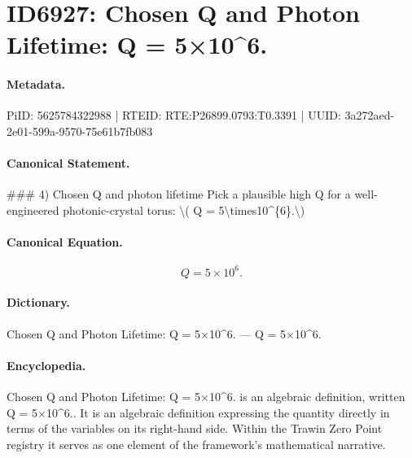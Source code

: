 \section*{ID6927: Chosen Q and Photon Lifetime: Q = 5×10\textasciicircum{}6.}
\paragraph{Metadata.}
PiID: 5625784322988 | RTEID: RTE:P26899.0793:T0.3391 | UUID: 3a272aed-2e01-599a-9570-75e61b7fb083

\paragraph{Canonical Statement.}
\#\#\# 4) Chosen Q and photon lifetime Pick a plausible high Q for a well-engineered photonic-crystal torus: \textbackslash{}( Q = 5\textbackslash{}times10\textasciicircum{}\{6\}.\textbackslash{})

\paragraph{Canonical Equation.}
\[
Q = 5\times10^{6}.
\]

\paragraph{Dictionary.}
Chosen Q and Photon Lifetime: Q = 5×10\textasciicircum{}6. — Q = 5×10\textasciicircum{}6.

\paragraph{Encyclopedia.}
Chosen Q and Photon Lifetime: Q = 5×10\textasciicircum{}6. is an algebraic definition, written Q = 5×10\textasciicircum{}6.. It is an algebraic definition expressing the quantity directly in terms of the variables on its right-hand side. Within the Trawin Zero Point registry it serves as one element of the framework's mathematical narrative.
